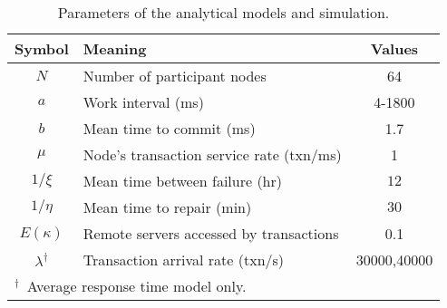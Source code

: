 \begin{table}[htbp]
  \centering
  \caption{Parameters of the analytical models and simulation. }
  \begin{tabular}{|c|l|c|}
    \hline
    \textbf{Symbol}   & \textbf{Meaning} & \textbf{Values} \\ \hline
    $N$ & Number of participant nodes  & 64 \\ \hline
    $a$ & Work interval (ms) & 4-1800 \\ \hline
    $b$ & Mean time to commit (ms) & 1.7 \\ \hline
    $\mu$ &  Node's transaction service rate (txn/ms) & 1  \\ \hline
    $1/\xi$   & Mean time between failure (hr)  & $12$   \\ \hline
    $1/\eta$  & Mean time to repair (min) & $30$ \\ \hline
    $E(\kappa)$  & Remote servers accessed by transactions & 0.1 \\ \hline
    $\lambda^{\mathrm{\dagger}}$  & Transaction arrival rate (txn/s)  & 30000,40000  \\ \hline
    \multicolumn{3}{l}{$^{\mathrm{\dagger}}$~Average response time model only.} \\
  \end{tabular}
  \label{tab:params}
\end{table}
